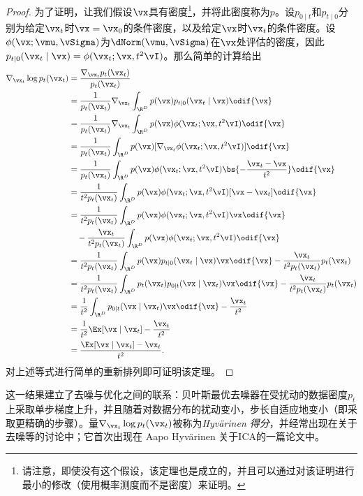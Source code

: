 \documentclass[../../book-main_zh.tex]{subfiles}
\begin{document}
\begin{proof}
    为了证明，让我们假设\(\vx\)具有密度\footnote{请注意，即使没有这个假设，该定理也是成立的，并且可以通过对该证明进行最小的修改（使用概率测度而不是密度）来证明。}，并将此密度称为\(p\)。设\(p_{0 \mid t}\)和\(p_{t \mid 0}\)分别为给定\(\vx_{t}\)时\(\vx = \vx_{0}\)的条件密度，以及给定\(\vx\)时\(\vx_{t}\)的条件密度。设\(\phi(\vx ; \vmu, \vSigma)\)为\(\dNorm(\vmu, \vSigma)\)在\(\vx\)处评估的密度，因此\(p_{t \mid 0}(\vx_{t} \mid \vx) = \phi(\vx_{t} ; \vx, t^{2}\vI)\)。那么简单的计算给出
    \begin{align}
        \nabla_{\vx_{t}} \log p_{t}(\vx_{t})
        &= \frac{\nabla_{\vx_{t}}p_{t}(\vx_{t})}{p_{t}(\vx_{t})} \\
        &=
        \frac{1}{p_{t}(\vx_{t})}\nabla_{\vx_{t}}\int_{\R^{D}}p(\vx)p_{t
        \mid 0}(\vx_{t} \mid \vx)\odif{\vx} \\
        &=
        \frac{1}{p_{t}(\vx_{t})}\nabla_{\vx_{t}}\int_{\R^{D}}p(\vx)\phi(\vx_{t}
        ;\vx, t^{2}\vI)\odif{\vx} \\
        &=
        \frac{1}{p_{t}(\vx_{t})}\int_{\R^{D}}p(\vx)[\nabla_{\vx_{t}}\phi(\vx_{t}
        ;\vx, t^{2}\vI)]\odif{\vx} \\
        &= \frac{1}{p_{t}(\vx_{t})}\int_{\R^{D}}p(\vx)\phi(\vx_{t} ;
        \vx, t^{2}\vI)\bs{-\frac{\vx_{t} - \vx}{t^{2}}}\odif{\vx} \\
        &=
        \frac{1}{t^{2}p_{t}(\vx_{t})}\int_{\R^{D}}p(\vx)\phi(\vx_{t}
        ; \vx, t^{2}\vI)[\vx - \vx_{t}]\odif{\vx} \\
        &= \frac{1}{t^{2}p_{t}(\vx_{t})}\int_{\R^{D}}p(\vx)\phi(\vx_{t} ; \vx,
        t^{2}\vI)\vx \odif{\vx} \\
        & \quad -
        \frac{\vx_{t}}{t^{2}p_{t}(\vx_{t})}\int_{\R^{D}}p(\vx)\phi(\vx_{t}
        ; \vx, t^{2}\vI)\odif{\vx}\nonumber \\
        &= \frac{1}{t^{2}p_{t}(\vx_{t})}\int_{\R^{D}}p(\vx)p_{t \mid
        0}(\vx_{t} \mid \vx)\vx \odif{\vx} -
        \frac{\vx_{t}}{t^{2}p_{t}(\vx_{t})}p_{t}(\vx_{t}) \\
        &=
        \frac{1}{t^{2}p_{t}(\vx_{t})}\int_{\R^{D}}p_{t}(\vx_{t})p_{0
        \mid t}(\vx \mid \vx_{t})\vx \odif{\vx} -
        \frac{\vx_{t}}{t^{2}p_{t}(\vx_{t})}p_{t}(\vx_{t}) \\
        &= \frac{1}{t^{2}}\int_{\R^{D}}p_{0 \mid t}(\vx \mid
        \vx_{t})\vx \odif{\vx} - \frac{\vx_{t}}{t^{2}} \\
        &= \frac{1}{t^{2}}\Ex[\vx \mid \vx_{t}] - \frac{\vx_{t}}{t^{2}} \\
        &= \frac{\Ex[\vx \mid \vx_{t}] - \vx_{t}}{t^{2}}.
    \end{align}
    对上述等式进行简单的重新排列即可证明该定理。
\end{proof}
这一结果建立了去噪与优化之间的联系：贝叶斯最优去噪器在受扰动的数据密度\(p_{t}\)上采取单步梯度上升，并且随着对数据分布的扰动变小，步长自适应地变小（即采取更精确的步骤）。量\(\nabla_{\vx_{t}}\log p_{t}(\vx_{t})\)被称为\textit{Hyv\"arinen 得分}，并经常出现在关于去噪等的讨论中；它首次出现在 Aapo Hyv\"arinen 关于ICA的一篇论文中\cite{hyvarinen05a}。
\end{document}
